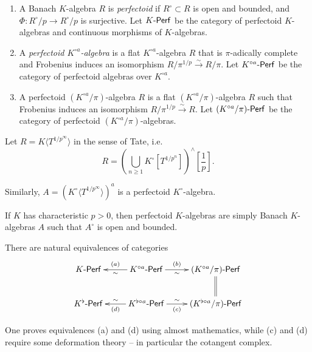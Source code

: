 \begin{definition}
\begin{enumerate}
  \item A Banach $K$-algebra $R$ is \emph{perfectoid} if $R^\circ\subset R$ is 
    open and bounded, and $\Phi:R^\circ/p \to R^\circ/p$ is surjective. Let 
    $K\textnormal{-}\mathsf{Perf}$ be the category of perfectoid $K$-algebras and continuous 
    morphisms of $K$-algebras. 
  \item A \emph{perfectoid $K^{\circ a}$-algebra} is a flat 
    $K^{\circ a}$-algebra $R$ that is $\pi$-adically complete and Frobenius 
    induces an isomorphism $R/\pi^{1/p} \xrightarrow\sim R/\pi$. Let 
    $K^{\circ a}\textnormal{-}\mathsf{Perf}$ be the category of perfectoid algebras over 
    $K^{\circ a}$. 
  \item A perfectoid $(K^{\circ a}/\pi)$-algebra $R$ is a flat 
    $(K^{\circ a}/\pi)$-algebra $R$ such that Frobenius induces an isomorphism 
    $R/\pi^{1/p} \xrightarrow \sim R$. Let $(K^{\circ a}/\pi)\textnormal{-}\mathsf{Perf}$ be the 
    category of perfectoid $(K^{\circ a}/\pi)$-algebras. 
\end{enumerate}
\end{definition}

\begin{example}
Let $R=K\langle T^{1/p^\infty}\rangle$ in the sense of Tate, i.e. 
\[
  R=\left(\bigcup_{n\geqslant 1} K^\circ[T^{1/p^n}]\right)^\wedge[\frac 1 p] .
\]
\end{example}

\begin{example}
Similarly, $A=(K^\circ\langle T^{1/p^\infty}\rangle)^a$ is a perfectoid 
$K^\circ$-algebra. 
\end{example}

\begin{example}
If $K$ has characteristic $p>0$, then perfectoid $K$-algebras are simply 
Banach $K$-algebras $A$ such that $A^\circ$ is open and bounded. 
\end{example}

\begin{theorem}
There are natural equivalences of categories 
\[\xymatrix{
  K\Perf 
    & \ar[l]^-\sim_-{(a)} K^{\circ a}\Perf \ar[r]_-\sim^-{(b)} 
    & (K^{\circ a}/\pi)\Perf \ar@{=}[d] \\
  K^\flat\Perf 
    & \ar[l]_-\sim^-{(d)} K^{\flat\circ a}\Perf \ar[r]^-\sim_-{(c)} 
    & (K^{\flat\circ a}/\pi)\Perf
}\]
\end{theorem}

One proves equivalences (a) and (d) using almost mathematics, while (c) and (d) 
require some deformation theory -- in particular the cotangent complex. 





